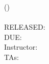 \newcommand{\blackcircle}{\tikz\draw[black,fill=black] (0,0) circle (1ex);}
\renewcommand{\circle}{\tikz\draw[black] (0,0) circle (1ex);}

\newcommand{\pts}[1]{\textbf{[#1 pts]}}


\predate{}
\postdate{}
\date{}





\section*{}
\begin{center}
  \textsc{\LARGE \hwNum} \\
  \vspace{1em}
  \textsc{\large \courseNum{} \courseName{} (\courseSem)} \\
  \courseUrl\\
  \vspace{1em}
  RELEASED: \outDate \\
  DUE: \dueDate \\
  Instructor: \instructorName \\
  TAs: \taNames
\end{center}

